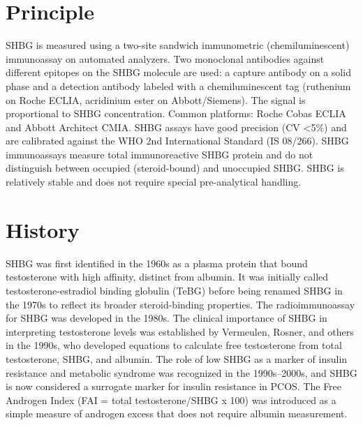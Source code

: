 \section*{Principle}
SHBG is measured using a two-site sandwich immunometric (chemiluminescent) immunoassay on automated analyzers. Two monoclonal antibodies against different epitopes on the SHBG molecule are used: a capture antibody on a solid phase and a detection antibody labeled with a chemiluminescent tag (ruthenium on Roche ECLIA, acridinium ester on Abbott/Siemens). The signal is proportional to SHBG concentration. Common platforms: Roche Cobas ECLIA and Abbott Architect CMIA. SHBG assays have good precision (CV <5\%) and are calibrated against the WHO 2nd International Standard (IS 08/266). SHBG immunoassays measure total immunoreactive SHBG protein and do not distinguish between occupied (steroid-bound) and unoccupied SHBG. SHBG is relatively stable and does not require special pre-analytical handling.

\section*{History}
SHBG was first identified in the 1960s as a plasma protein that bound testosterone with high affinity, distinct from albumin. It was initially called testosterone-estradiol binding globulin (TeBG) before being renamed SHBG in the 1970s to reflect its broader steroid-binding properties. The radioimmunoassay for SHBG was developed in the 1980s. The clinical importance of SHBG in interpreting testosterone levels was established by Vermeulen, Rosner, and others in the 1990s, who developed equations to calculate free testosterone from total testosterone, SHBG, and albumin. The role of low SHBG as a marker of insulin resistance and metabolic syndrome was recognized in the 1990s--2000s, and SHBG is now considered a surrogate marker for insulin resistance in PCOS. The Free Androgen Index (FAI = total testosterone/SHBG x 100) was introduced as a simple measure of androgen excess that does not require albumin measurement.

